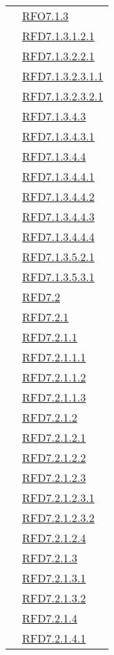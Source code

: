 \begin{longtable}{|>{\centering}m{5cm}|m{5cm}<{\centering}|}
& \hyperlink{RFO7.1.3}{RFO7.1.3}\\
& \hyperlink{RFD7.1.3.1.2.1}{RFD7.1.3.1.2.1}\\
& \hyperlink{RFD7.1.3.2.2.1}{RFD7.1.3.2.2.1}\\
& \hyperlink{RFD7.1.3.2.3.1.1}{RFD7.1.3.2.3.1.1}\\
& \hyperlink{RFD7.1.3.2.3.2.1}{RFD7.1.3.2.3.2.1}\\
& \hyperlink{RFD7.1.3.4.3}{RFD7.1.3.4.3}\\
& \hyperlink{RFD7.1.3.4.3.1}{RFD7.1.3.4.3.1}\\
& \hyperlink{RFD7.1.3.4.4}{RFD7.1.3.4.4}\\
& \hyperlink{RFD7.1.3.4.4.1}{RFD7.1.3.4.4.1}\\
& \hyperlink{RFD7.1.3.4.4.2}{RFD7.1.3.4.4.2}\\
& \hyperlink{RFD7.1.3.4.4.3}{RFD7.1.3.4.4.3}\\
& \hyperlink{RFD7.1.3.4.4.4}{RFD7.1.3.4.4.4}\\
& \hyperlink{RFD7.1.3.5.2.1}{RFD7.1.3.5.2.1}\\
& \hyperlink{RFD7.1.3.5.3.1}{RFD7.1.3.5.3.1}\\
& \hyperlink{RFD7.2}{RFD7.2}\\
& \hyperlink{RFD7.2.1}{RFD7.2.1}\\
& \hyperlink{RFD7.2.1.1}{RFD7.2.1.1}\\
& \hyperlink{RFD7.2.1.1.1}{RFD7.2.1.1.1}\\
& \hyperlink{RFD7.2.1.1.2}{RFD7.2.1.1.2}\\
& \hyperlink{RFD7.2.1.1.3}{RFD7.2.1.1.3}\\
& \hyperlink{RFD7.2.1.2}{RFD7.2.1.2}\\
& \hyperlink{RFD7.2.1.2.1}{RFD7.2.1.2.1}\\
& \hyperlink{RFD7.2.1.2.2}{RFD7.2.1.2.2}\\
& \hyperlink{RFD7.2.1.2.3}{RFD7.2.1.2.3}\\
& \hyperlink{RFD7.2.1.2.3.1}{RFD7.2.1.2.3.1}\\
& \hyperlink{RFD7.2.1.2.3.2}{RFD7.2.1.2.3.2}\\
& \hyperlink{RFD7.2.1.2.4}{RFD7.2.1.2.4}\\
& \hyperlink{RFD7.2.1.3}{RFD7.2.1.3}\\
& \hyperlink{RFD7.2.1.3.1}{RFD7.2.1.3.1}\\
& \hyperlink{RFD7.2.1.3.2}{RFD7.2.1.3.2}\\
& \hyperlink{RFD7.2.1.4}{RFD7.2.1.4}\\
& \hyperlink{RFD7.2.1.4.1}{RFD7.2.1.4.1}\\

\end{longtable}
